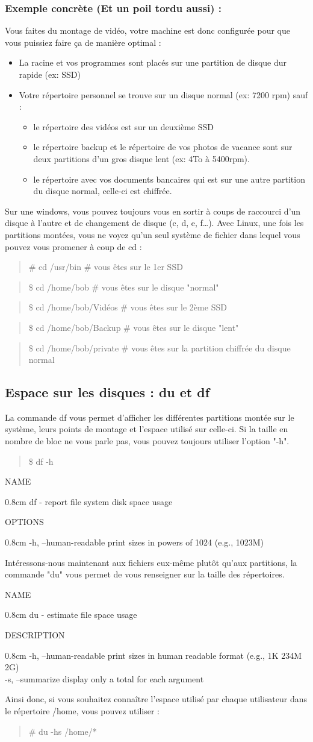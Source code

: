 \documentclass[a4paper,11pt]{article}
\newcommand{\commande}[1] {
    \begin{quote}
    \tt\raggedright #1 
    \end{quote}
}
\newcommand{\man}[2]{
    \begin{tcolorbox}[toprule=3mm,width=\textwidth,outer arc=0mm,colbacktitle=grayman,coltitle=black,colback={grayman},colframe={grayman},title={man : \tt #1}]
        \tt\raggedright #2
    \end{tcolorbox}
}
\newcommand{\mandesc}[1]{
    \begin{adjustwidth}{0.8cm}{}
        #1
    \end{adjustwidth}
}
\begin{document}
\subsubsection*{Exemple concrète (Et un poil tordu aussi) :}
\par Vous faites du montage de vidéo, votre machine est donc configurée pour que vous puissiez faire ça de manière optimal :
\begin{itemize}
\item La racine et vos programmes sont placés sur une partition de disque dur rapide (ex: SSD)
\item Votre répertoire personnel se trouve sur un disque normal (ex: 7200 rpm) sauf :
    \begin{itemize}
    \item le répertoire des vidéos est sur un deuxième SSD
    \item le répertoire backup et le répertoire de vos photos de vacance sont sur deux partitions d'un gros disque lent (ex: 4To à 5400rpm).
    \item le répertoire avec vos documents bancaires qui est sur une autre partition du disque normal, celle-ci est chiffrée.
    \end{itemize}
\end{itemize}
\par Sur une windows, vous pouvez toujours vous en sortir à coups de raccourci d'un disque à l'autre et de changement de disque (c, d, e, f\dots). Avec Linux, une fois les partitions montées, vous ne voyez qu'un seul système de fichier dans lequel vous pouvez vous promener à coup de cd :
\commande{\# cd /usr/bin \# vous êtes sur le 1er SSD}
\commande{\$ cd /home/bob \# vous êtes sur le disque "normal"}
\commande{\$ cd /home/bob/Vidéos \# vous êtes sur le 2ème SSD}
\commande{\$ cd /home/bob/Backup \# vous êtes sur le disque "lent"}
\commande{\$ cd /home/bob/private \# vous êtes sur la partition chiffrée du disque normal}

\subsection{Espace sur les disques : du et df}
\par La commande df vous permet d'afficher les différentes partitions montée sur le système, leurs points de montage et l'espace utilisé sur celle-ci. Si la taille en nombre de bloc ne vous parle pas, vous pouvez toujours utiliser l'option "-h".
\commande{\$ df -h}
\man{df}{
NAME
\mandesc{df - report file system disk space usage}
OPTIONS
\mandesc{-h, --human-readable print sizes in powers of 1024 (e.g., 1023M)}
}
\par Intéressons-nous maintenant aux fichiers eux-même plutôt qu'aux partitions, la commande "du" vous permet de vous renseigner sur la taille des répertoires.
\man{du}{
NAME
\mandesc{du - estimate file space usage}
DESCRIPTION
\mandesc{-h, --human-readable print sizes in human readable format (e.g., 1K 234M 2G)\\
-s, --summarize display only a total for each argument}
}
Ainsi donc, si vous souhaitez connaître l'espace utilisé par chaque utilisateur dans le répertoire /home, vous pouvez utiliser :
\commande{\# du -hs /home/*}
\end{document}
